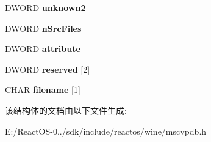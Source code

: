\begin{DoxyCompactItemize}
D\+W\+O\+RD {\bfseries unknown2}
\item 
\mbox{\label{struct___p_d_b___s_y_m_b_o_l___f_i_l_e___e_x_a5bebeb09af51e9bbec6302148bda910d}} 
D\+W\+O\+RD {\bfseries n\+Src\+Files}
\item 
\mbox{\label{struct___p_d_b___s_y_m_b_o_l___f_i_l_e___e_x_a9beff4d4ef37ec3c4addd14c5deb4910}} 
D\+W\+O\+RD {\bfseries attribute}
\item 
\mbox{\label{struct___p_d_b___s_y_m_b_o_l___f_i_l_e___e_x_a89067a47912c0e807c9d60a3ceeeea6d}} 
D\+W\+O\+RD {\bfseries reserved} \mbox{[}2\mbox{]}
\item 
\mbox{\label{struct___p_d_b___s_y_m_b_o_l___f_i_l_e___e_x_a0b7f840b93771f6f6bfa3977e93a55f7}} 
C\+H\+AR {\bfseries filename} \mbox{[}1\mbox{]}
\end{DoxyCompactItemize}


该结构体的文档由以下文件生成\+:\begin{DoxyCompactItemize}
\item 
E\+:/\+React\+O\+S-\/0../sdk/include/reactos/wine/mscvpdb.\+h\end{DoxyCompactItemize}
